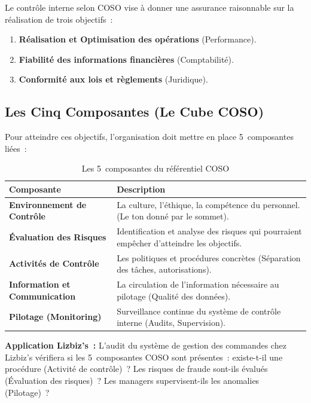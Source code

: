 Le contrôle interne selon COSO vise à donner une assurance raisonnable sur la réalisation
de trois objectifs~:
\begin{enumerate}
    \item \textbf{Réalisation et Optimisation des opérations} (Performance).
    \item \textbf{Fiabilité des informations financières} (Comptabilité).
    \item \textbf{Conformité aux lois et règlements} (Juridique).
\end{enumerate}

\subsection{Les Cinq Composantes (Le Cube COSO)}

Pour atteindre ces objectifs, l'organisation doit mettre en place 5~composantes liées~:

\begin{table}[h!]
\centering
\small
\begin{tabular}{p{4cm}p{8cm}}
    \toprule
    \textbf{Composante} & \textbf{Description} \\
    \midrule
    \textbf{Environnement de Contrôle} & La culture, l'éthique, la compétence du personnel.
        (Le \og{}ton donné par le sommet\fg{}). \\
    \textbf{Évaluation des Risques} & Identification et analyse des risques qui pourraient
        empêcher d'atteindre les objectifs. \\
    \textbf{Activités de Contrôle} & Les politiques et procédures concrètes (Séparation des
        tâches, autorisations). \\
    \textbf{Information et Communication} & La circulation de l'information nécessaire au
        pilotage (Qualité des données). \\
    \textbf{Pilotage (Monitoring)} & Surveillance continue du système de contrôle interne
        (Audits, Supervision). \\
    \bottomrule
\end{tabular}
\caption{Les 5~composantes du référentiel COSO}
\end{table}

\begin{boxlizbiz}
\textbf{Application Lizbiz's~:}
L'audit du système de gestion des commandes chez Lizbiz's vérifiera si les
5~composantes COSO sont présentes~: existe-t-il une procédure (Activité de contrôle)~?
Les risques de fraude sont-ils évalués (Évaluation des risques)~? Les managers supervisent-ils
les anomalies (Pilotage)~?
\end{boxlizbiz}

